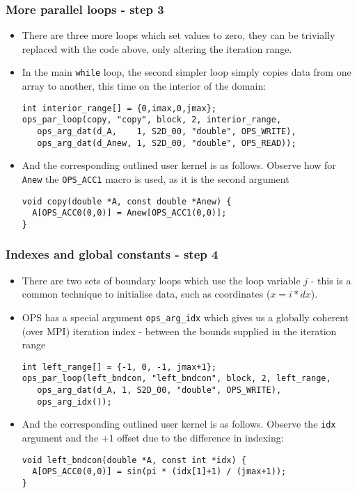 \documentclass{beamer}
\begin{document}
\begin{frame}[fragile]
\frametitle{More parallel loops - step 3}
\begin{itemize}
\item There are three more loops which set values to zero, they can be trivially replaced with the code above, only altering the iteration range.
\item In the main \texttt{while} loop, the second simpler loop simply copies data from one array to another, this time on the interior of the domain:
\begin{lstlisting}
int interior_range[] = {0,imax,0,jmax};
ops_par_loop(copy, "copy", block, 2, interior_range,
   ops_arg_dat(d_A,    1, S2D_00, "double", OPS_WRITE),
   ops_arg_dat(d_Anew, 1, S2D_00, "double", OPS_READ));
\end{lstlisting}  
  \item And the corresponding outlined user kernel is as follows. Observe how for \texttt{Anew} the \texttt{OPS\_ACC1} macro is used, as it is the second argument
\begin{lstlisting}
void copy(double *A, const double *Anew) {
  A[OPS_ACC0(0,0)] = Anew[OPS_ACC1(0,0)];
}
\end{lstlisting}  
\end{itemize}
\end{frame}

\begin{frame}[fragile]
\frametitle{Indexes and global constants - step 4}
\begin{itemize}
\item There are two sets of boundary loops which use the loop variable $j$ - this is a common technique to initialise data, such as coordinates ($x=i*dx$).
\item OPS has a special argument \texttt{ops\_arg\_idx} which gives us a globally coherent (over MPI) iteration index - between the bounds supplied in the iteration range
\begin{lstlisting}
int left_range[] = {-1, 0, -1, jmax+1};
ops_par_loop(left_bndcon, "left_bndcon", block, 2, left_range,
   ops_arg_dat(d_A, 1, S2D_00, "double", OPS_WRITE),
   ops_arg_idx());
\end{lstlisting}  
  \item And the corresponding outlined user kernel is as follows. Observe the \texttt{idx} argument and the $+1$ offset due to the difference in indexing:
\begin{lstlisting}
void left_bndcon(double *A, const int *idx) {
  A[OPS_ACC0(0,0)] = sin(pi * (idx[1]+1) / (jmax+1));
}
\end{lstlisting}  
\end{itemize}
\end{frame}
\end{document}
